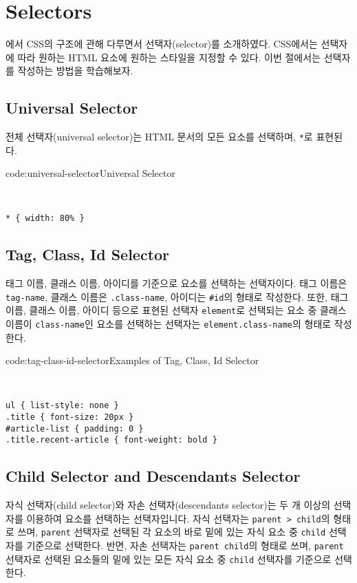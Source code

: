 \section{Selectors} \label{sect:selectors}

에서 CSS의 구조에 관해 다루면서 선택자(selector)를 소개하였다. CSS에서는 선택자에 따라 원하는 HTML 요소에 원하는 스타일을 지정할 수 있다. 이번 절에서는 선택자를 작성하는 방법을 학습해보자. 

\subsection*{Universal Selector}

전체 선택자(universal selector)는 HTML 문서의 모든 요소를 선택하며, \texttt{*}로 표현된다.

\begin{codeenv}{code:universal-selector}{Universal Selector}\begin{verbatim}


* { width: 80% }
\end{verbatim}
\end{codeenv}

\subsection*{Tag, Class, Id Selector}
태그 이름, 클래스 이름, 아이디를 기준으로 요소를 선택하는 선택자이다. 태그 이름은 \texttt{tag-name}, 클래스 이름은 \texttt{.class-name}, 아이디는 \texttt{\#id}의 형태로 작성한다. 또한, 태그 이름, 클래스 이름, 아이디 등으로 표현된 선택자 \texttt{element}로 선택되는 요소 중 클래스 이름이 \texttt{class-name}인 요소를 선택하는 선택자는 \texttt{element.class-name}의 형태로 작성한다.

\begin{codeenv}{code:tag-class-id-selector}{Examples of Tag, Class, Id Selector}\begin{verbatim}


ul { list-style: none }
.title { font-size: 20px }
#article-list { padding: 0 }
.title.recent-article { font-weight: bold }
\end{verbatim}
\end{codeenv}

\subsection*{Child Selector and Descendants Selector}
자식 선택자(child selector)와 자손 선택자(descendants selector)는 두 개 이상의 선택자를 이용하여 요소를 선택하는 선택자입니다. 자식 선택자는 \texttt{parent > child}의 형태로 쓰며, \texttt{parent} 선택자로 선택된 각 요소의 바로 밑에 있는 자식 요소 중 \texttt{child} 선택자를 기준으로 선택한다. 반면, 자손 선택자는 \texttt{parent child}의 형태로 쓰며, \texttt{parent} 선택자로 선택된 요소들의 밑에 있는 모든 자식 요소 중 \texttt{child} 선택자를 기준으로 선택한다.


